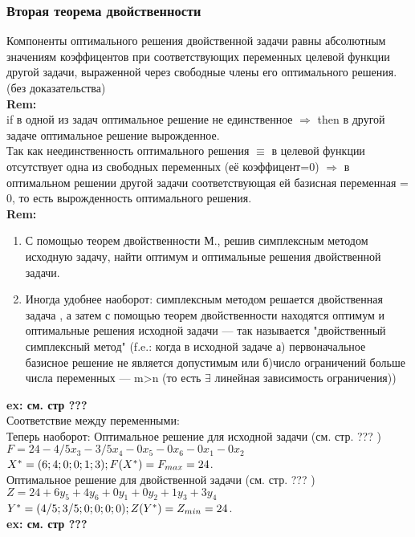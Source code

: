 \subsubsection{Вторая теорема двойственности}
Компоненты оптимального решения двойственной задачи равны абсолютным значениям коэффицентов при соответствующих переменных целевой функции другой задачи, выраженной через свободные члены его оптимального решения.\\
(без доказательства) \\
\textbf{Rem:}\\
if в одной из задач оптимальное решение не единственное $\Rightarrow$ then в другой задаче оптимальное решение вырожденное.\\
Так как неединственность оптимального решения $\equiv$ в целевой функции отсутствует одна из свободных переменных (её коэффицент=0) $\Rightarrow$ в оптимальном решении другой задачи соответствующая ей базисная переменная = 0, то есть вырожденность оптимального решения.\\
\textbf{Rem:}
\begin{enumerate}
    \item С помощью теорем двойственности М., решив симплексным методом исходную задачу, найти оптимум и оптимальные решения двойственной задачи.
    \item Иногда удобнее наоборот: симплексным методом решается двойственная задача , а затем с помощью теорем двойственности находятся оптимум и оптимальные решения исходной задачи --- так называется "двойственный симплексный метод" (f.e.: когда в исходной задаче а) первоначальное базисное решение не является допустимым или б)число ограничений больше числа переменных --- m>n (то есть $\exists$ линейная зависимость ограничения))
\end{enumerate}
\textbf{ex: см. стр ??? }\\
Соответствие между переменными:\\
Теперь наоборот:
Оптимальное решение для исходной задачи (см. стр. ??? )\\
$F=24-4/5x_3-3/5x_4-0x_5-0x_6-0x_1-0x_2$\\
$X^*=(6;4;0;0;1;3); \\
F(X^*)=F_{max}=24$.\\
Оптимальное решение для двойственной задачи (см. стр. ??? )\\
$Z=24+6y_5+4y_6+0y_1+0y_2+1y_3+3y_4$\\
$Y^*=(4/5;3/5;0;0;0;0); \\
Z(Y^*)=Z_{min}=24$.\\
\textbf{ex: см. стр ??? }\\


